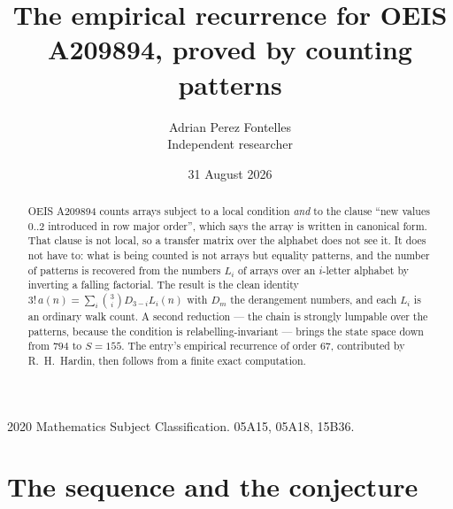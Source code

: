 \documentclass[11pt,a4paper]{article}
\title{The empirical recurrence for OEIS A209894, proved by counting patterns}
\author{Adrian Perez Fontelles\\ \small Independent researcher}
\date{31 August 2026}
\theoremstyle{plain}
\theoremstyle{definition}
\begin{document}
\maketitle

\begin{abstract}
OEIS A209894 counts arrays subject to a local condition \emph{and} to the clause ``new values
$0..2$ introduced in row major order'', which says the array is written in canonical
form. That clause is not local, so a transfer matrix over the alphabet does not see it. It
does not have to: what is being counted is not arrays but equality patterns, and the number
of patterns is recovered from the numbers $L_i$ of arrays over an $i$-letter alphabet by
inverting a falling factorial. The result is the clean identity
$3!\,a(n)=\sum_i\binom{3}{i}D_{3-i}L_i(n)$ with $D_m$ the derangement numbers,
and each $L_i$ is an ordinary walk count. A second reduction --- the chain is strongly
lumpable over the patterns, because the condition is relabelling-invariant --- brings the
state space down from $794$ to $S=155$. The entry's empirical recurrence of order
$67$, contributed by R.~H.~Hardin, then follows from a finite exact computation.
\end{abstract}

\noindent\small 2020 Mathematics Subject Classification. 05A15, 05A18, 15B36.\normalsize

\section{The sequence and the conjecture}
\end{document}
